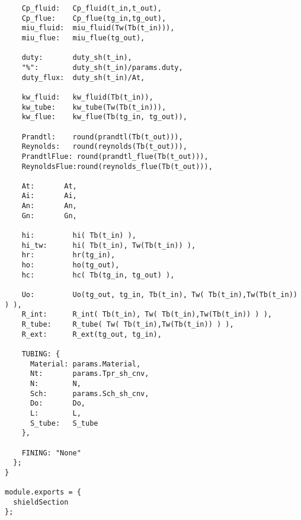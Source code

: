 \begin{verbatim}
    Cp_fluid:   Cp_fluid(t_in,t_out),
    Cp_flue:    Cp_flue(tg_in,tg_out),
    miu_fluid:  miu_fluid(Tw(Tb(t_in))),
    miu_flue:   miu_flue(tg_out),

    duty:       duty_sh(t_in),
    "%":        duty_sh(t_in)/params.duty,
    duty_flux:  duty_sh(t_in)/At,

    kw_fluid:   kw_fluid(Tb(t_in)),
    kw_tube:    kw_tube(Tw(Tb(t_in))),
    kw_flue:    kw_flue(Tb(tg_in, tg_out)),

    Prandtl:    round(prandtl(Tb(t_out))),
    Reynolds:   round(reynolds(Tb(t_out))),
    PrandtlFlue: round(prandtl_flue(Tb(t_out))),
    ReynoldsFlue:round(reynolds_flue(Tb(t_out))),

    At:       At,
    Ai:       Ai,
    An:       An,
    Gn:       Gn,

    hi:         hi( Tb(t_in) ),
    hi_tw:      hi( Tb(t_in), Tw(Tb(t_in)) ),
    hr:         hr(tg_in),
    ho:         ho(tg_out),
    hc:         hc( Tb(tg_in, tg_out) ),

    Uo:         Uo(tg_out, tg_in, Tb(t_in), Tw( Tb(t_in),Tw(Tb(t_in)) ) ),
    R_int:      R_int( Tb(t_in), Tw( Tb(t_in),Tw(Tb(t_in)) ) ),
    R_tube:     R_tube( Tw( Tb(t_in),Tw(Tb(t_in)) ) ),
    R_ext:      R_ext(tg_out, tg_in),

    TUBING: {
      Material: params.Material,
      Nt:       params.Tpr_sh_cnv,
      N:        N,
      Sch:      params.Sch_sh_cnv,
      Do:       Do,
      L:        L,
      S_tube:   S_tube
    },
    
    FINING: "None"
  };
}

module.exports = {
  shieldSection
};
\end{verbatim}

